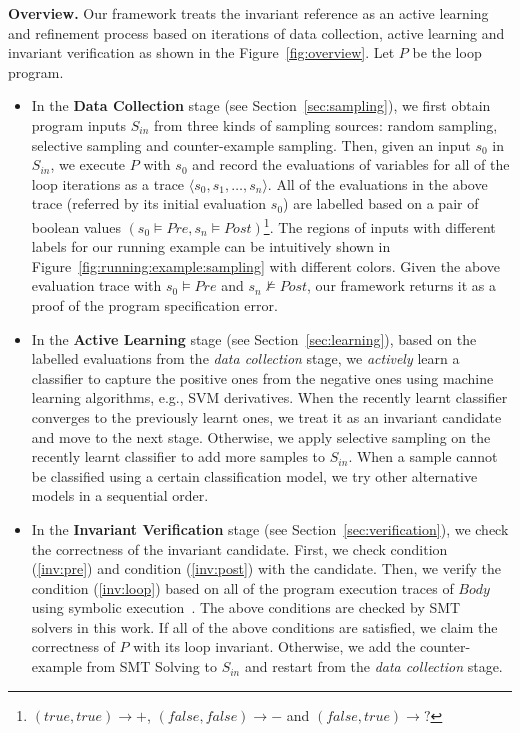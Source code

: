 \medskip\noindent
\textbf{Overview.}
Our framework treats the invariant reference as an active learning and refinement process
based on iterations of data collection, active learning and invariant verification
as shown in the Figure~\ref{fig:overview}.
Let $P$ be the loop program.
\begin{itemize}
    \item
    In the \textbf{Data Collection} stage (see Section~\ref{sec:sampling}),
    we first obtain program inputs $S_{\mathit{in}}$ from three kinds of sampling sources:
    random sampling, selective sampling and counter-example sampling.
    Then, given an input $s_0$ in $S_{\mathit{in}}$, we execute $P$ with $s_0$
    and record the evaluations of variables for all of the loop iterations
    as a trace $\langle s_0, s_1, \ldots, s_n \rangle$.
    All of the evaluations in the above trace (referred by its initial evaluation $s_0$)
    are labelled based on a pair of boolean values
    $(s_0 \models \mathit{Pre}, s_n \models \mathit{Post})$\footnote{
        $(\mathit{true}, \mathit{true}) \rightarrow +$,
        $(\mathit{false}, \mathit{false}) \rightarrow -$
        and $(\mathit{false}, \mathit{true}) \rightarrow ?$}.
    The regions of inputs with different labels for our running example can be intuitively shown
    in Figure~\ref{fig:running:example:sampling} with different colors.
    Given the above evaluation trace with
    $s_0 \models \mathit{Pre}$ and $s_n \not\models \mathit{Post}$,
    our framework returns it as a proof of the program specification error.
    \item
    In the \textbf{Active Learning} stage (see Section~\ref{sec:learning}),
    based on the labelled evaluations from the \emph{data collection} stage,
    we \emph{actively} learn a classifier to capture the positive ones from the negative ones
    using machine learning algorithms, e.g., SVM derivatives.
    When the recently learnt classifier converges to the previously learnt ones,
    we treat it as an invariant candidate and move to the next stage.
    Otherwise, we apply selective sampling on the recently learnt classifier
    to add more samples to $S_{\mathit{in}}$.
    When a sample cannot be classified using a certain classification model,
    we try other alternative models in a sequential order.
    \item
    In the \textbf{Invariant Verification} stage (see Section~\ref{sec:verification}),
    we check the correctness of the invariant candidate.
    First, we check condition (\ref{inv:pre}) and condition (\ref{inv:post}) with the candidate.
    Then, we verify the condition (\ref{inv:loop})
    based on all of the program execution traces of $\mathit{Body}$ using symbolic execution~\cite{}.
    The above conditions are checked by SMT~\cite{barrett2009satisfiability} solvers in this work.
    If all of the above conditions are satisfied,
    we claim the correctness of $P$ with its loop invariant.
    Otherwise, we add the counter-example from SMT Solving to $S_{\mathit{in}}$
    and restart from the \emph{data collection} stage.
\end{itemize}


